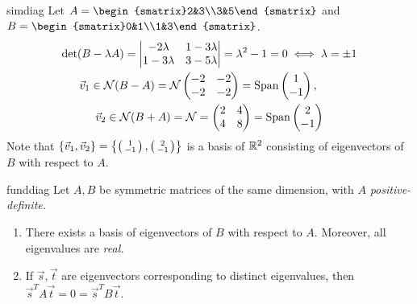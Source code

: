 \begin{example}{}{simdiag}
	Let $A=\begin{smatrix}2&3\\3&5\end{smatrix}$ and $B=\begin{smatrix}0&1\\1&3\end{smatrix}$.
	\begin{gather*}
		\det(B-\lambda A)=
		\begin{vmatrix}
			-2\lambda&1-3\lambda\\
			1-3\lambda&3-5\lambda
		\end{vmatrix}
		=\lambda^2-1=0\iff \lambda=\pm 1\\
		\vec v_1\in\mathcal{N}(B-A)=\mathcal{N}
		\begin{pmatrix}
			-2&-2\\-2&-2
		\end{pmatrix}
		=\operatorname{Span}\begin{pmatrix}1\\-1\end{pmatrix},\qquad\\
		\vec v_2\in\mathcal{N}(B+A)=\mathcal{N}=
		\begin{pmatrix}
			2&4\\4&8
		\end{pmatrix}
		=\operatorname{Span}\begin{pmatrix}2\\-1\end{pmatrix}
	\end{gather*}
	Note that $\{\vec v_1,\vec v_2\}=\left\{\left(\begin{smallmatrix}1\\-1\end{smallmatrix}\right),\left(\begin{smallmatrix}2\\-1\end{smallmatrix}\right)\right\}$ is a basis of $\mathbb{R}^2$ consisting of eigenvectors of $B$ with respect to $A$.
\end{example}


\begin{thm}{}{funddiag}
	Let $A,B$ be symmetric matrices of the same dimension, with $A$ \emph{positive-definite.\footnotemark}
	\begin{enumerate}
	  \item There exists a basis of eigenvectors of $B$ with respect to $A$. Moreover, all eigenvalues are \emph{real.}
	  \item If $\vec s,\vec t$ are eigenvectors corresponding to distinct eigenvalues, then $\vec s^TA\vec t=0=\vec s^TB\vec t$.
	\end{enumerate}
\end{thm}



